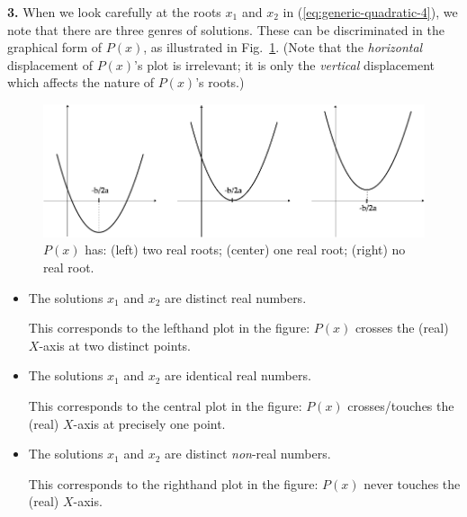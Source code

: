 \smallskip

{\bf 3.}
When we look carefully at the roots $x_1$ and $x_2$ in (\ref{eq:generic-quadratic-4}), we note that there are three genres of solutions.  These can be discriminated in the graphical form of
$P(x)$, as illustrated in Fig.~\ref{fig:SecondDegreeInit}.  (Note that the {\em horizontal} displacement of $P(x)$'s plot is irrelevant; it is only the {\em vertical} displacement which affects the nature of $P(x)$'s roots.)
\begin{figure}[htb]
\begin{center}
       \includegraphics[scale=0.325]{FiguresArithmetic/SecondDegreeInit}
\caption{$P(x)$ has: (left) two real roots; (center) one real root; (right) no real root.}
\label{fig:SecondDegreeInit}
\end{center}
\end{figure}
\begin{itemize}
\item
The solutions $x_1$ and $x_2$ are distinct real numbers.

\smallskip

This corresponds to the lefthand plot in the figure: $P(x)$ crosses the (real) $X$-axis at two distinct points.

\item
The solutions $x_1$ and $x_2$ are identical real numbers.

\smallskip

This corresponds to the central plot in the figure: $P(x)$ crosses/touches the (real) $X$-axis at precisely one point.

\item
The solutions $x_1$ and $x_2$ are distinct {\em non}-real numbers.

\smallskip

This corresponds to the righthand plot in the figure: $P(x)$ never touches the (real) $X$-axis.
\end{itemize}

